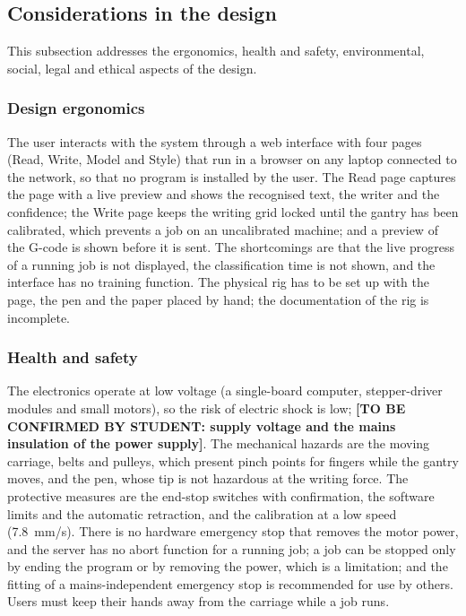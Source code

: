 \subsection{Considerations in the design} %
\label{sec:dis-considerations}

This subsection addresses the ergonomics, health and safety, environmental, social, legal and ethical aspects of the design.

    \subsubsection{Design ergonomics}

        The user interacts with the system through a web interface with four pages (Read, Write, Model and Style) that run in a browser on any laptop connected to the network, so that no program is installed by the user.
        The Read page captures the page with a live preview and shows the recognised text, the writer and the confidence; the Write page keeps the writing grid locked until the gantry has been calibrated, which prevents a job on an uncalibrated machine; and a preview of the G-code is shown before it is sent.
        The shortcomings are that the live progress of a running job is not displayed, the classification time is not shown, and the interface has no training function.
        The physical rig has to be set up with the page, the pen and the paper placed by hand; the documentation of the rig is incomplete.

    \subsubsection{Health and safety}

        The electronics operate at low voltage (a single-board computer, stepper-driver modules and small motors), so the risk of electric shock is low; \textbf{[TO BE CONFIRMED BY STUDENT: supply voltage and the mains insulation of the power supply]}.
        The mechanical hazards are the moving carriage, belts and pulleys, which present pinch points for fingers while the gantry moves, and the pen, whose tip is not hazardous at the writing force.
        The protective measures are the end-stop switches with confirmation, the software limits and the automatic retraction, and the calibration at a low speed (7.8~mm/s).
        There is no hardware emergency stop that removes the motor power, and the server has no abort function for a running job; a job can be stopped only by ending the program or by removing the power, which is a limitation; and the fitting of a mains-independent emergency stop is recommended for use by others.
        Users must keep their hands away from the carriage while a job runs.

